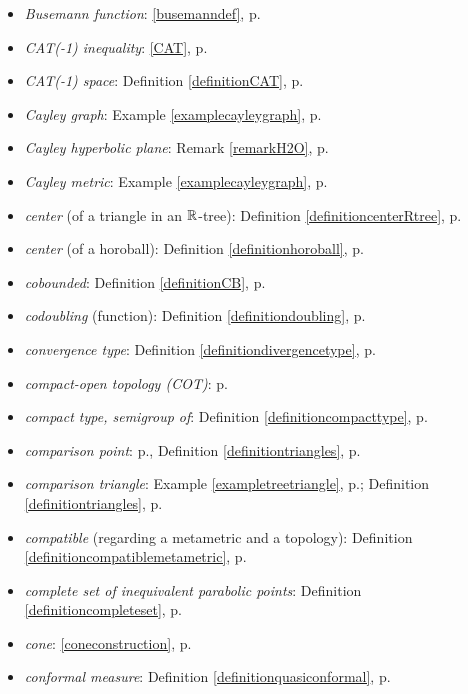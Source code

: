 \begin{itemize}
\item\emph{Busemann function}: \eqref{busemanndef}, p.\pageref{busemanndef}
\item\emph{CAT(-1) inequality}: \eqref{CAT}, p.\pageref{CAT}
\item\emph{CAT(-1) space}: Definition \ref{definitionCAT}, p.\pageref{definitionCAT}
\item\emph{Cayley graph}: Example \ref{examplecayleygraph}, p.\pageref{examplecayleygraph}
\item\emph{Cayley hyperbolic plane}: Remark \ref{remarkH2O}, p.\pageref{remarkH2O}
\item\emph{Cayley metric}: Example \ref{examplecayleygraph}, p.\pageref{examplecayleygraph}
\item\emph{center} (of a triangle in an $\R$-tree): Definition \ref{definitioncenterRtree}, p.\pageref{definitioncenterRtree}
\item\emph{center} (of a horoball): Definition \ref{definitionhoroball}, p.\pageref{definitionhoroball}
\item\emph{cobounded}: Definition \ref{definitionCB}, p.\pageref{definitionCB}
\item\emph{codoubling} (function): Definition \ref{definitiondoubling}, p.\pageref{definitiondoubling}
\item\emph{convergence type}: Definition \ref{definitiondivergencetype}, p.\pageref{definitiondivergencetype}
\item\emph{compact-open topology (COT)}: p.\pageref{subsectiontopologies}
\item\emph{compact type, semigroup of}: Definition \ref{definitioncompacttype}, p.\pageref{definitioncompacttype}
\item\emph{comparison point}: p.\pageref{subsectionCAT}, Definition \ref{definitiontriangles}, p.\pageref{definitiontriangles}
\item\emph{comparison triangle}: Example \ref{exampletreetriangle}, p.\pageref{exampletreetriangle}; Definition \ref{definitiontriangles}, p.\pageref{definitiontriangles}
\item\emph{compatible} (regarding a metametric and a topology): Definition \ref{definitioncompatiblemetametric}, p.\pageref{definitioncompatiblemetametric}
\item\emph{complete set of inequivalent parabolic points}: Definition \ref{definitioncompleteset}, p.\pageref{definitioncompleteset}
\item\emph{cone}: \eqref{coneconstruction}, p.\pageref{coneconstruction}
\item\emph{conformal measure}: Definition \ref{definitionquasiconformal}, p.\pageref{definitionquasiconformal}

\end{itemize}
